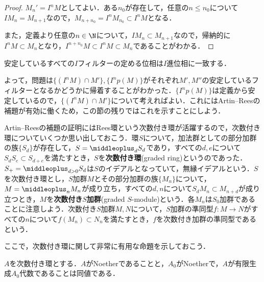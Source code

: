 \begin{proof}
	$M_n'=I^nM$としてよい．ある$n_0$が存在して，任意の$n\leq n_0$について$IM_n=M_{n+1}$なので，$M_{n+n_0}=I^nM_{n_0}\subset I^nM$となる．
	
	また，定義より任意の$n\in\N$について，$IM_n\subset M_{n+1}$なので，帰納的に$I^nM\subset M_n$となり，$I^{n+n_0}M\subset I^nM\subset M_n$であることがわかる．
\end{proof}

\begin{cor}
	安定しているすべての$I$フィルターの定める位相は$I$進位相に一致する．
\end{cor}

よって，問題は$\{(I^nM)\cap M'\},\{I^n p(M)\}$がそれぞれ$M',M''$の安定しているフィルターとなるかどうかに帰着することがわかった．$\{I^n p(M)\}$は定義から安定しているので，$\{(I^nM)\cap M'\}$について考えればよい．これにはArtin--Reesの補題が有効に働くため，この節の残りではこれを示すことにしよう．

Artin--Reesの補題の証明にはRees環という次数付き環が活躍するので，次数付き環についていくつか思い出しておこう．環$S$について，加法群としての部分加群の族$\{S_d\}$が存在して，$S=\middleoplus_d S_d$であり，すべての$d,e$について$S_dS_e\subset S_{d+e}$を満たすとき，$S$を\textbf{次数付き環}(graded ring)というのであった．$S_+=\middleoplus_{d>0}S_d$は$S$のイデアルとなっていて，無縁イデアルという．$S$を次数付き環とし，$S$加群$M$とその部分加群の族$\{M_n\}$について，$M=\middleoplus_n M_n$が成り立ち，すべての$d,n$について$S_dM_n\subset M_{n+d}$が成り立つとき，$M$を\textbf{次数付き}$S$\textbf{加群}(graded $S$-module)という．各$M_n$は$S_0$加群であることに注意しよう．次数付き$S$加群$M,N$について，$S$加群の準同型$f:M\to N$がすべての$n$について$f(M_n)\subset N_n$を満たすとき，$f$を次数付き加群の準同型であるという．

ここで，次数付き環に関して非常に有用な命題を示しておこう．

\begin{prop}\label{prop:次数付き環のNoether性}
	$A$を次数付き環とする．$A$がNoetherであることと，$A_0$がNoetherで，$A$が有限生成$A_0$代数であることは同値である．
\end{prop}

